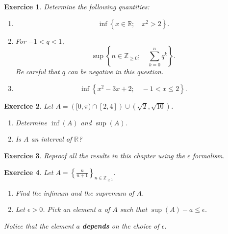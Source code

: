 \documentclass[
	fontsize=10pt, %
	twoside=true, %
	secnumdepth=1, %
	numbers=noenddot, %
]{kaobook}
\newtheorem{exer}{Exercice}[chapter]
\begin{document}
\begin{exer}
Determine the following quantities:
\begin{enumerate}
	\item \begin{equation*}\inf\left\{x\in\mathbb{R};\quad x^2>2\right\}.\end{equation*}
	\item For $-1<q<1$,\begin{equation*}\sup\left\{n\in\mathbb{Z}_{\geq 0};\quad \sum\limits_{k=0}^{n}q^k\right\}.\end{equation*} Be careful that $q$ can be negative in this question.
	\item \begin{equation*}\inf\left\{x^2-3x+2;\quad -1<x\leq 2\right\}.\end{equation*}
\end{enumerate}
\end{exer}

\begin{exer}
Let $A=\left([0,\pi)\cap[2,4]\right)\cup(\sqrt{2},\sqrt{10})$.
\begin{enumerate}
	\item Determine $\inf(A)$ and $\sup(A)$.
	\item Is $A$ an interval of $\mathbb{R}$?
\end{enumerate}
\end{exer}

\begin{exer}
Reproof all the results in this chapter using the $\epsilon$ formalism.
\end{exer}

\begin{exer}
Let $A=\left\{\frac{n}{n+1}\right\}_{n\in\mathbb{Z}_{\geq 1}}$.
\begin{enumerate}
	\item Find the infimum and the supremum of $A$.
	\item Let $\epsilon>0$. Pick an element $a$ of $A$ such that $\sup(A)-a\leq \epsilon$.
\end{enumerate}
Notice that the element $a$ \textbf{depends} on the choice of $\epsilon$.
\end{exer}
\end{document}
